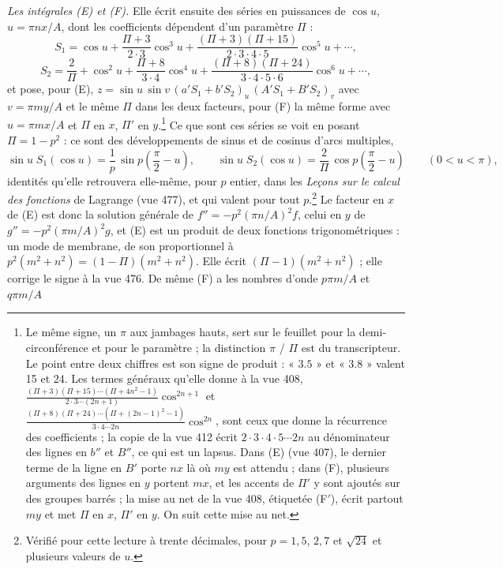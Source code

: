 \documentclass[11pt,a4paper]{article}
\begin{document}
\emph{Les intégrales (E) et (F).} Elle écrit ensuite des séries en puissances de
$\cos u$, $u = \pi n x/A$, dont les coefficients dépendent d'un paramètre $\Pi$ :
\[
S_1 = \cos u + \frac{\Pi+3}{2\cdot 3}\cos^3 u + \frac{(\Pi+3)(\Pi+15)}{2\cdot3\cdot4\cdot5}\cos^5 u + \cdots,
\]
\[
S_2 = \frac{2}{\Pi} + \cos^2 u + \frac{\Pi+8}{3\cdot 4}\cos^4 u + \frac{(\Pi+8)(\Pi+24)}{3\cdot4\cdot5\cdot6}\cos^6 u + \cdots,
\]
et pose, pour (E), $z = \sin u\,\sin v\,(a'S_1 + b'S_2)_u\,(A'S_1 + B'S_2)_v$ avec
$v = \pi m y/A$ et le même $\Pi$ dans les deux facteurs, pour (F) la même forme avec
$u = \pi m x/A$ et $\Pi$ en $x$, $\Pi'$ en $y$.\footnote{Le même signe, un $\pi$ aux
jambages hauts, sert sur le feuillet pour la demi-circonférence et pour le paramètre ;
la distinction $\pi$ / $\Pi$ est du transcripteur. Le point entre deux chiffres est
son signe de produit : « $3.5$ » et « $3.8$ » valent 15 et 24. Les termes généraux
qu'elle donne à la vue 408,
$\frac{(\Pi+3)(\Pi+15)\cdots(\Pi+4n^2-1)}{2\cdot3\cdots(2n+1)}\cos^{2n+1}$ et
$\frac{(\Pi+8)(\Pi+24)\cdots(\Pi+(2n-1)^2-1)}{3\cdot4\cdots 2n}\cos^{2n}$, sont ceux
que donne la récurrence des coefficients ; la copie de la vue 412 écrit
$2\cdot3\cdot4\cdot5\cdots 2n$ au dénominateur des lignes en $b''$ et $B''$, ce qui est
un lapsus. Dans (E) (vue 407), le dernier terme de la ligne en $B'$ porte $nx$ là où
$my$ est attendu ; dans (F), plusieurs arguments des lignes en $y$ portent $mx$, et
les accents de $\Pi'$ y sont ajoutés sur des groupes barrés ; la mise au net de la vue
408, étiquetée (F$'$), écrit partout $my$ et met $\Pi$ en $x$, $\Pi'$ en $y$. On suit
cette mise au net.} Ce que sont ces séries se voit en posant $\Pi = 1 - p^2$ : ce sont
des développements de sinus et de cosinus d'arcs multiples,
\[
\sin u\;S_1(\cos u) = \frac{1}{p}\,\sin p\!\left(\frac{\pi}{2} - u\right), \qquad
\sin u\;S_2(\cos u) = \frac{2}{\Pi}\,\cos p\!\left(\frac{\pi}{2} - u\right)
\qquad (0 < u < \pi),
\]
identités qu'elle retrouvera elle-même, pour $p$ entier, dans les \emph{Leçons sur le
calcul des fonctions} de Lagrange (vue 477), et qui valent pour tout $p$.\footnote{Vérifié
pour cette lecture à trente décimales, pour $p = 1{,}5$, $2{,}7$ et $\sqrt{24}$ et
plusieurs valeurs de $u$.} Le facteur en $x$ de (E) est donc la solution générale de
$f'' = -p^2(\pi n/A)^2 f$, celui en $y$ de $g'' = -p^2(\pi m/A)^2 g$, et (E) est un
produit de deux fonctions trigonométriques : un mode de membrane, de son proportionnel
à $p^2(m^2+n^2) = (1-\Pi)(m^2+n^2)$. Elle écrit $(\Pi - 1)(m^2+n^2)$ ; elle corrige le
signe à la vue 476. De même (F) a les nombres d'onde $p\pi m/A$ et $q\pi m/A$
\end{document}
